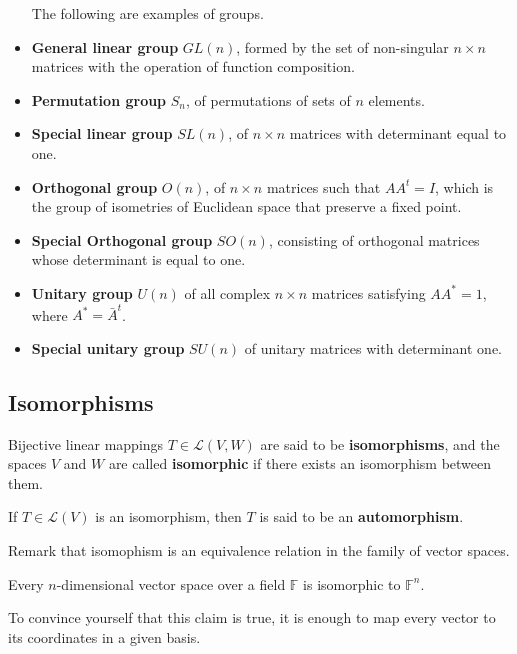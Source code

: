 \begin{example}
	\begin{itemize} The following are examples of groups.
		\item \textbf{General linear group} $GL(n)$, formed by the set of non-singular $n \times n$ matrices with the operation of function composition.
		\item \textbf{Permutation group} $S_n$, of permutations of sets of $n$ elements.
		\item \textbf{Special linear group} $SL(n)$, of $n \times n$ matrices with determinant equal to one.
		\item \textbf{Orthogonal group} $O(n)$, of $n \times n$ matrices such that $A A^t = I$, which is the group of isometries of Euclidean space that preserve a fixed point.
		\item \textbf{Special Orthogonal group} $SO(n)$, consisting of orthogonal matrices whose determinant is equal to one.
		\item \textbf{Unitary group} $U(n)$ of all complex $n \times n$ matrices satisfying $A A^\ast = 1$, where $A^\ast = \bar{A}^t$.
		\item \textbf{Special unitary group} $SU(n)$ of unitary matrices with determinant one.
	\end{itemize}
\end{example}

\subsection{Isomorphisms}

\begin{definition}[Isomorsphism]
	Bijective linear mappings $T \in \mathcal{L}(V,W)$ are said to be \textbf{isomorphisms}, and the spaces $V$ and $W$ are called \textbf{isomorphic} if there exists an isomorphism between them.

	If $T \in \mathcal{L}(V)$ is an isomorphism, then $T$ is said to be an \textbf{automorphism}.
\end{definition}

Remark that isomophism is an equivalence relation in the family of vector spaces.

\begin{theorem}
	Every $n$-dimensional vector space over a field $\mathbb{F}$ is isomorphic to $\mathbb{F}^n$.
\end{theorem}

To convince yourself that this claim is true, it is enough to map every vector to its coordinates in a given basis.

